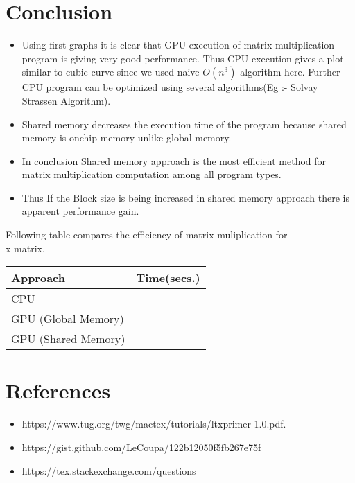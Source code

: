 \documentclass[12pt, a4paper]{article}
\begin{document}

	\newpage
	\section{Conclusion}

	\begin{itemize}
		\item Using first graphs it is clear that GPU execution of matrix multiplication program is giving very good performance. Thus CPU execution gives a plot similar to cubic curve since we used naive $O(n^3)$ algorithm here. Further CPU program can be optimized using several algorithms(Eg :- Solvay Strassen Algorithm).

		\item Shared memory decreases the execution time of the program because shared memory is onchip memory unlike global memory. 

		\item In conclusion Shared memory approach is the most efficient method for matrix multiplication computation among all program types.

		\item Thus If the Block size is being increased in shared memory approach there is apparent performance gain.
	\end{itemize}

	\hfill \break
	Following table compares the efficiency of matrix muliplication for \\ x matrix.
	\hfill \break

	\begin{tabu} to 1 \textwidth { | X[l] | X[r] | }
		 \hline
		 \textbf{Approach} & \textbf{Time(secs.)}  \\
		 \hline
		 CPU &   \\
		 \hline
		 GPU (Global Memory) &   \\
		 \hline
		 GPU (Shared Memory) &   \\
		 \hline
	\end{tabu}		

	\newpage


	\section{References}

	\begin{itemize}
	  \item https://www.tug.org/twg/mactex/tutorials/ltxprimer-1.0.pdf.
	  \item https://gist.github.com/LeCoupa/122b12050f5fb267e75f
	  \item https://tex.stackexchange.com/questions
	\end{itemize}
\end{document}
